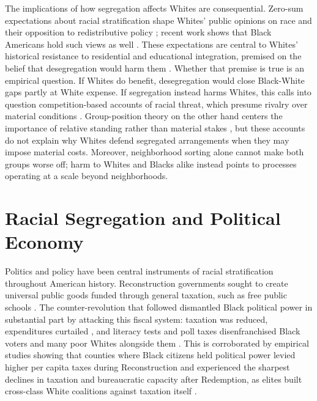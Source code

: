 \documentclass[11pt]{article}
\begin{document}
The implications of how segregation affects Whites are consequential. Zero-sum expectations about racial stratification shape Whites' public opinions on race \citep{wetts_privilege_2018,bobo_attitudes_1996} and their opposition to redistributive policy \citep{gilens_race_1996,mcghee_sum_2021}; recent work shows that Black Americans hold such views as well \citep{warren_zero-sum_2025}. These expectations are central to Whites' historical resistance to residential and educational integration, premised on the belief that desegregation would harm them \citep{crowder_spatial_2008,frey_central_1979,rich_backlash_2025,johnson_children_2019}. Whether that premise is true is an empirical question. If Whites do benefit, desegregation would close Black-White gaps partly at White expense. If segregation instead harms Whites, this calls into question competition-based accounts of racial threat, which presume rivalry over material conditions \citep{blalock_1967}. Group-position theory on the other hand centers the importance of relative standing rather than material stakes \citep{blumer_race_1958,bobo_attitudes_1996}, but these accounts do not explain why Whites defend segregated arrangements when they may impose material costs. Moreover, neighborhood sorting alone cannot make both groups worse off; harm to Whites and Blacks alike instead points to processes operating at a scale beyond neighborhoods.

\section{Racial Segregation and Political Economy}

Politics and policy have been central instruments of racial stratification throughout American history. Reconstruction governments sought to create universal public goods funded through general taxation, such as free public schools \citep[p.~638]{dubois_black_1935}. The counter-revolution that followed dismantled Black political power in substantial part by attacking this fiscal system: taxation was reduced, expenditures curtailed \citep[chap.~14]{dubois_black_1935}, and literacy tests and poll taxes disenfranchised Black voters and many poor Whites alongside them \citep[p.~6]{perman_struggle_2001}. This is corroborated by empirical studies showing that counties where Black citizens held political power levied higher per capita taxes during Reconstruction and experienced the sharpest declines in taxation and bureaucratic capacity after Redemption, as elites built cross-class White coalitions against taxation itself \citep{logan_black_2020,chacon_democratization_2020,suryanarayan_slavery_2021}.
\end{document}
